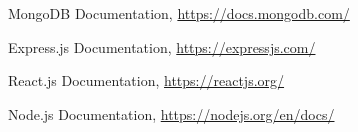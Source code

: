 \documentclass{article}
\begin{document}
\newpage
\begin{thebibliography}{9}
    MongoDB Documentation,
    \url{https://docs.mongodb.com/}

    Express.js Documentation,
    \url{https://expressjs.com/}

    React.js Documentation,
    \url{https://reactjs.org/}

    Node.js Documentation,
    \url{https://nodejs.org/en/docs/}
\end{thebibliography}
\end{document}
